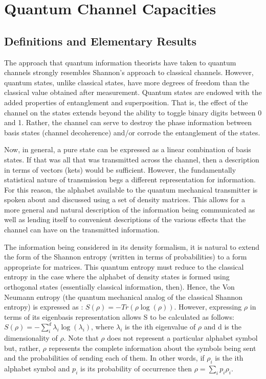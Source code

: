 \documentclass[letterpaper,twoside,10pt]{article}
\begin{document}
\section{Quantum Channel Capacities}


\subsection{Definitions and Elementary Results}
The approach that quantum information theorists have taken to quantum channels strongly resembles Shannon's approach to classical channels. However, quantum states, unlike classical states, have more degrees of freedom than the classical value obtained after measurement. Quantum states are endowed with the added properties of entanglement and superposition. That is, the effect of the channel on the states extends beyond the ability to toggle binary digits between 0 and 1. Rather, the channel can serve to destroy the phase information between basis states (channel decoherence) and/or corrode the entanglement of the states.

Now, in general, a pure state can be expressed as a linear combination of basis states. If that was all that was transmitted across the channel, then a description in terms of vectors (kets) would be sufficient. However, the fundamentally statistical nature of transmission begs a different representation for information. For this reason, the alphabet available to the quantum mechanical transmitter is spoken about and discussed using a set of density matrices. This allows for a more general and natural description of the information being communicated as well as lending itself to convenient descriptions of the various effects that the channel can have on the transmitted information.

The information being considered in its density formalism, it is natural to extend the form of the Shannon entropy (written in terms of probabilities) to a form appropriate for matrices. This quantum entropy must reduce to the classical entropy in the case where the alphabet of density states is formed using orthogonal states (essentially classical information, then). Hence, the Von Neumann entropy (the quantum mechanical analog of the classical Shannon entropy) is expressed as : $S(\rho)=-Tr(\rho\log(\rho))$. However, expressing $\rho$ in terms of its eigenbasis representation allows S to be calculated as follows: $S(\rho)=-\sum_i^d\lambda_i\log(\lambda_i)$, where $\lambda_i$ is the ith eigenvalue of $\rho$ and d is the dimensionality of $\rho$. Note that $\rho$ does not represent a particular alphabet symbol but, rather, $\rho$ represents the complete information about the symbols being sent and the probabilities of sending each of them. In other words, if $\rho_i$ is the ith alphabet symbol and $p_i$ is its probability of occurrence then $\rho = \sum_i p_i\rho_i$.
\end{document}
